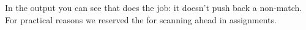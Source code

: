 \typebuffer[option=TEX]

In the output you can see that \type {\noarguments} does the job: it doesn't push
back a non-match. For practical reasons we reserved the \type {\norelax} for
scanning ahead in assignments.

\startlines \tttf
\getbuffer
\stoplines

\stopsectionlevel

\stopdocument

%
%
%
%
%


%
%

%
%
%
%
%
%
